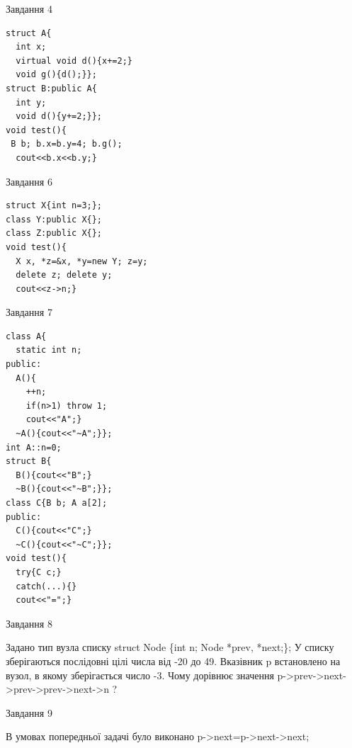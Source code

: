 \documentclass[12pt, ukrainian]{article}
\begin{document}
{{{{{{{{{{{{{\begin{minipage}[t]{7cm}
{\begin{center}Завдання {4}\end{center}}
\vspace{-6mm}

\begin{verbatim}
struct A{
  int x;
  virtual void d(){x+=2;}
  void g(){d();}};
struct B:public A{
  int y;
  void d(){y+=2;}};
void test(){
 B b; b.x=b.y=4; b.g();
  cout<<b.x<<b.y;}
\end{verbatim}            


               
{\begin{center}Завдання {6}\end{center}}
\vspace{-6mm}

\begin{verbatim}
struct X{int n=3;};
class Y:public X{};
class Z:public X{};
void test(){
  X x, *z=&x, *y=new Y; z=y;
  delete z; delete y;
  cout<<z->n;}
\end{verbatim}            


               
{\begin{center}Завдання {7}\end{center}}
\vspace{-6mm}

\begin{verbatim}
class A{
  static int n; 
public:
  A(){
    ++n; 
    if(n>1) throw 1;
    cout<<"A";}
  ~A(){cout<<"~A";}};
int A::n=0;
struct B{
  B(){cout<<"B";}
  ~B(){cout<<"~B";}};
class C{B b; A a[2];
public:
  C(){cout<<"C";}
  ~C(){cout<<"~C";}};
void test(){
  try{C c;} 
  catch(...){} 
  cout<<"=";}
\end{verbatim}            


\end{minipage}
               
{\begin{center}Завдання {8}\end{center}}
\vspace{-6mm}
Задано тип вузла списку
struct Node \{int n; Node *prev, *next;\};
У списку зберігаються послідовні цілі числа від -20 до 49. Вказівник p встановлено на вузол, в якому зберігається число -3.
Чому дорівнює значення p->prev->next->prev->prev->next->n ?\par

               
{\begin{center}Завдання {9}\end{center}}
\vspace{-6mm}
В умовах попередньої задачі було виконано p->next=p->next->next;

}}}}}}}}}}}}}
\end{document}
